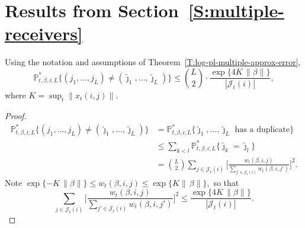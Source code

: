 \documentclass[final]{statsoc}
\newcommand{\qedhere}{}
\begin{document}
\newcommand{\multiplereceiverssection}{\ref{S:multiple-receivers}}
\section{Results from Section~\protect\multiplereceiverssection{}}
\label{S:multiple-recipient-proofs}

\begin{lemma}\label{L:coupling-prob-bound}
Using the notation and assumptions of
Theorem~\ref{T:log-pl-multiple-approx-error},
\[
    \mathbb{P}^\ast_{t,\beta,i;L}
    \Big\{
        (j_1, \ldots, j_L)
            \neq
            (\tilde \jmath_1, \ldots, \tilde \jmath_L)
    \Big\}
        \leq
        \binom{L}{2}
        \cdot
        \frac{\exp\{4 K \, \| \beta \|\}}{| \mathcal{J}_t(i) |},
\]
where $K = \sup_t \| x_t(i,j) \|$.
\end{lemma}
\begin{proof}
\begin{align*}
    \mathbb{P}^\ast_{t,\beta,i;L}
    \Big\{
        (j_1, \ldots, j_L)
            \neq
            (\tilde \jmath_1, \ldots, \tilde \jmath_L)
    \Big\}
        &=
        \mathbb{P}^\ast_{t,\beta,i;L}
        \Big\{
            \text{$\tilde \jmath_1, \ldots, \tilde \jmath_L$ has a duplicate}
        \} \\
        &\leq
        \sum_{k < l}
            \mathbb{P}^\ast_{t,\beta,i;L}
            \Big\{
                \tilde \jmath_k = \tilde \jmath_l
            \Big\} \\
        &=
            \binom{L}{2}
            \sum_{j \in \mathcal{J}_t(i)}
                \Big[
                    \frac{
                        w_t(\beta, i, j)
                    }{
                        \sum_{j' \in \mathcal{J}_t(i)} w_t(\beta, i, j')
                    }
                \Big]^2.
\end{align*}
Note
\(
    \exp\{-K \, \| \beta \|\}
        \leq w_t(\beta,i,j)
        \leq \exp\{K \| \, \beta \|\},
\)
so that
\[
    \sum_{j \in \mathcal{J}_t(i)}
        \Big[
            \frac{
                w_t(\beta, i, j)
            }{
                \sum_{j' \in \mathcal{J}_t(i)} w_t(\beta, i, j')
            }
        \Big]^2
    \leq
        \frac{\exp\{4 K \, \| \beta \|\}}{| \mathcal{J}_t(i) |}.
    \qedhere
\]
\end{proof}
\end{document}
